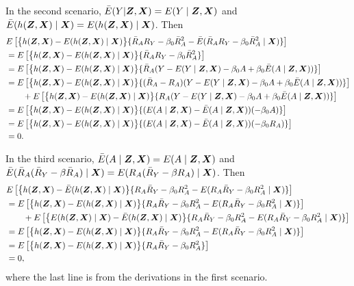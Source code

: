 \documentclass[12pt]{article}
\begin{document}
{In the second scenario,  $ \bar E(Y| \bm{Z}, \bm{X}) =  E(Y\mid \bm{Z}, \bm{X}) $ and $ \bar E(h(\bm{Z}, \bm{X})\mid \bm{X})  =   E(h(\bm{Z}, \bm{X})\mid \bm{X})   $. Then 
 \begin{align*}
	&E\left[	\big\{h(\bm{Z}, \bm{X})- E(h(\bm{Z}, \bm{X})\mid\bm{X})\big\} \{\bar R_A R_Y - \beta_0 \bar R_A^2- \bar E(\bar R_A  R_Y  - \beta_0\bar  R_A ^2 \mid \bm{X} )\} \right] \\
	&= E\left[	\big\{h(\bm{Z}, \bm{X})- E(h(\bm{Z}, \bm{X})\mid\bm{X})\big\} \{\bar R_A R_Y - \beta_0 \bar R_A^2  \}  \right] \\ 
	&= E\left[	\big\{h(\bm{Z}, \bm{X})- E(h(\bm{Z}, \bm{X})\mid\bm{X})\big\} \{\bar R_A (Y-   E(Y\mid \bm Z, \bm{X} ) -\beta_0 A  + \beta_0 \bar E(A\mid \bm{Z}, \bm{X}) ) \}  \right] \\ 
	&= E\left[	\big\{h(\bm{Z}, \bm{X})- E(h(\bm{Z}, \bm{X})\mid\bm{X})\big\} \{(\bar R_A  - R_A)(Y-   E(Y\mid \bm Z, \bm{X} ) -\beta_0 A  + \beta_0 \bar E(A\mid \bm{Z}, \bm{X}) ) \}  \right] \\ 
	&\qquad + E\left[	\big\{h(\bm{Z}, \bm{X})- E(h(\bm{Z}, \bm{X})\mid\bm{X})\big\} \{ R_A(Y-   E(Y\mid \bm Z, \bm{X} ) -\beta_0 A  + \beta_0 \bar E(A\mid \bm{Z}, \bm{X}) ) \}  \right] \\ 
	&= E\left[	\big\{h(\bm{Z}, \bm{X})- E(h(\bm{Z}, \bm{X})\mid\bm{X})\big\} \{(E(A\mid \bm{Z}, \bm{X}) - \bar E(A\mid \bm{Z}, \bm{X}) )( -\beta_0 A ) \}  \right] \\
	&= E\left[	\big\{h(\bm{Z}, \bm{X})- E(h(\bm{Z}, \bm{X})\mid\bm{X})\big\} \{(E(A\mid \bm{Z}, \bm{X}) - \bar E(A\mid \bm{Z}, \bm{X}) )( -\beta_0 R_A ) \}  \right] \\ 
	&=0 .
\end{align*}

In the third scenario, $ \bar E(A \mid \bm{Z}, \bm{X}) =  E(A\mid \bm{Z}, \bm{X}) $ and $ \bar E( \bar R_A ( \bar R_Y- \beta \bar R_A) \mid \bm{X})  =    E( R_A ( \bar R_Y- \beta R_A) \mid \bm{X})   $. Then 
 \begin{align*}
	&E\left[	\big\{h(\bm{Z}, \bm{X})- \bar E(h(\bm{Z}, \bm{X})\mid\bm{X})\big\} \{R_A \bar R_Y - \beta_0 R_A^2-  E(R_A  \bar R_Y  - \beta_0 R_A ^2 \mid \bm{X} )\} \right] \\
	&= E\left[	\big\{h(\bm{Z}, \bm{X})-  E(h(\bm{Z}, \bm{X})\mid\bm{X})\big\} \{R_A \bar R_Y - \beta_0 R_A^2-  E(R_A  \bar R_Y  - \beta_0 R_A ^2 \mid \bm{X} )\} \right] \\
	&\qquad + E\left[	\big\{E(h(\bm{Z}, \bm{X})\mid\bm{X}) -  \bar E(h(\bm{Z}, \bm{X})\mid\bm{X})\big\} \{R_A \bar R_Y - \beta_0 R_A^2-  E(R_A \bar R_Y  - \beta_0 R_A ^2 \mid \bm{X} )\} \right] \\
		&= E\left[	\big\{h(\bm{Z}, \bm{X})-  E(h(\bm{Z}, \bm{X})\mid\bm{X})\big\} \{R_A \bar R_Y - \beta_0 R_A^2-  E(R_A  \bar R_Y  - \beta_0 R_A ^2 \mid \bm{X} )\} \right] \\
		&= E\left[	\big\{h(\bm{Z}, \bm{X})-  E(h(\bm{Z}, \bm{X})\mid\bm{X})\big\} \{R_A \bar R_Y - \beta_0 R_A^2\} \right] \\
		&= 0,
\end{align*}
where the last line is from the derivations in the first scenario. 

}
\end{document}

